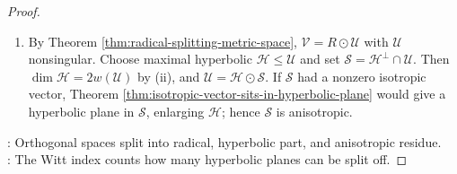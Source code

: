 \begin{theorem}
\begin{proof}
\begin{enumerate}[label=(\roman*)]
Conversely, Theorem \ref{thm:nonsingular-completions-hyperbolic-extensions} completes a $w(\mathcal{V})$-dimensional totally isotropic subspace to a hyperbolic subspace $\mathcal{H}_0$ of dimension $2w(\mathcal{V})$.  If a maximal hyperbolic $\mathcal{H}$ had dimension $2k<2w(\mathcal{V})$, choose hyperbolic $\mathcal{H}_1\leq\mathcal{H}_0$ with $\dim\mathcal{H}_1=2k$ and extend an isometry $\mathcal{H}\to\mathcal{H}_1$ to $\Phi\in\mathcal{O}(\mathcal{V})$; then $\Phi^{-1}\mathcal{H}_0$ is a larger hyperbolic subspace containing $\mathcal{H}$, contradiction.
\item By Theorem \ref{thm:radical-splitting-metric-space}, $\mathcal{V}=R\odot\mathcal{U}$ with $\mathcal{U}$ nonsingular. Choose maximal hyperbolic $\mathcal{H}\leq\mathcal{U}$ and set $\mathcal{S}=\mathcal{H}^{\perp}\cap\mathcal{U}$. Then $\dim\mathcal{H}=2w(\mathcal{U})$ by (ii), and $\mathcal{U}=\mathcal{H}\odot\mathcal{S}$. If $\mathcal{S}$ had a nonzero isotropic vector, Theorem \ref{thm:isotropic-vector-sits-in-hyperbolic-plane} would give a hyperbolic plane in $\mathcal{S}$, enlarging $\mathcal{H}$; hence $\mathcal{S}$ is anisotropic.
\end{enumerate}
: Orthogonal spaces split into radical, hyperbolic part, and anisotropic residue.\\
: The Witt index counts how many hyperbolic planes can be split off.
\end{proof}
\end{theorem}
